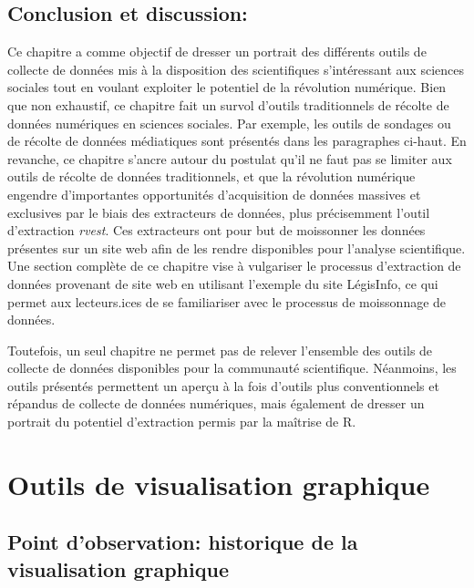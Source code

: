 \documentclass[
  letterpaper,
  DIV=11,
  numbers=noendperiod]{scrreprt}
\begin{document}
\hypertarget{conclusion-et-discussion}{%
\section{Conclusion et discussion:}\label{conclusion-et-discussion}}

Ce chapitre a comme objectif de dresser un portrait des différents
outils de collecte de données mis à la disposition des scientifiques
s'intéressant aux sciences sociales tout en voulant exploiter le
potentiel de la révolution numérique. Bien que non exhaustif, ce
chapitre fait un survol d'outils traditionnels de récolte de données
numériques en sciences sociales. Par exemple, les outils de sondages ou
de récolte de données médiatiques sont présentés dans les paragraphes
ci-haut. En revanche, ce chapitre s'ancre autour du postulat qu'il ne
faut pas se limiter aux outils de récolte de données traditionnels, et
que la révolution numérique engendre d'importantes opportunités
d'acquisition de données massives et exclusives par le biais des
extracteurs de données, plus précisemment l'outil d'extraction
\emph{rvest}. Ces extracteurs ont pour but de moissonner les données
présentes sur un site web afin de les rendre disponibles pour l'analyse
scientifique. Une section complète de ce chapitre vise à vulgariser le
processus d'extraction de données provenant de site web en utilisant
l'exemple du site LégisInfo, ce qui permet aux lecteurs.ices de se
familiariser avec le processus de moissonnage de données.

Toutefois, un seul chapitre ne permet pas de relever l'ensemble des
outils de collecte de données disponibles pour la communauté
scientifique. Néanmoins, les outils présentés permettent un aperçu à la
fois d'outils plus conventionnels et répandus de collecte de données
numériques, mais également de dresser un portrait du potentiel
d'extraction permis par la maîtrise de R.


\hypertarget{outils-de-visualisation-graphique}{%
\chapter{Outils de visualisation
graphique}\label{outils-de-visualisation-graphique}}

\hypertarget{point-dobservation-historique-de-la-visualisation-graphique}{%
\section{Point d'observation: historique de la visualisation
graphique}\label{point-dobservation-historique-de-la-visualisation-graphique}}
\end{document}
